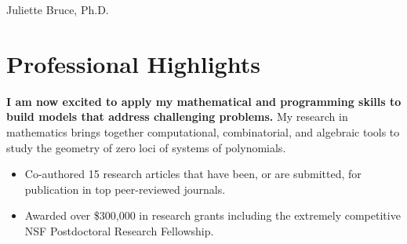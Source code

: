 \documentclass[
	10pt, %
]{FreemanCV}
\begin{document}
\begin{paracol}{2} %


\parbox[][0.11\textheight][c]{\linewidth}{ %
	\centering %
	
	{\sffamily\Huge Juliette Bruce, Ph.D.} %
	
	\medskip %
	
	
	\vfill %
}

\vspace{-.5cm}
\section{Professional Highlights}

\textbf{I am now excited to apply my mathematical and programming skills to build models that address challenging problems. } My research in mathematics brings together computational, combinatorial, and algebraic tools to study the geometry of zero loci of systems of polynomials. 
\begin{itemize}[leftmargin=*]
\item Co-authored 15 research articles that have been, or are submitted, for publication in top peer-reviewed journals. 
\item Awarded over \$300,000 in research grants including the extremely competitive NSF Postdoctoral Research Fellowship.%
\end{itemize}


\end{paracol}
\end{document}

